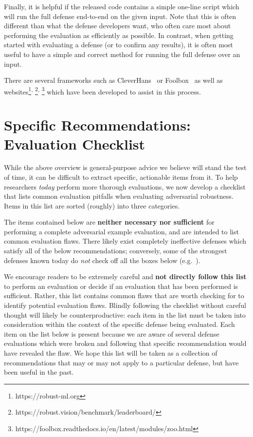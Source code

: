 \documentclass{article} %
\begin{document}
Finally, it is helpful if the released code contains a simple one-line
script which will run the full defense end-to-end on the given input.
%
Note that this is often different than what the defense developers want,
who often care most about performing the evaluation as efficiently as
possible.
%
In contrast, when getting started with evaluating a defense (or to
confirm any results), it is
often most useful to have a simple and correct method for running the
full defense over an input.

There are several frameworks such as CleverHans~\citep{papernot2018cleverhans} or Foolbox~\citep{rauber2017foolbox}
as well as websites\footnote{https://robust-ml.org}\textsuperscript{,}%
\footnote{https://robust.vision/benchmark/leaderboard/}\textsuperscript{,}%
\footnote{https://foolbox.readthedocs.io/en/latest/modules/zoo.html}
which have been developed to assist in this process.


\section{Specific Recommendations: Evaluation Checklist}
\label{sec:dont_do_bad_science}
\label{sec:pleaseactuallythink}
While the above overview is general-purpose advice we believe will stand the
test of time, it can be difficult to extract specific, actionable items
from it.
%
To help researchers \emph{today} perform more thorough evaluations,
we now develop a checklist that lists common evaluation
pitfalls when evaluating adversarial robustness. Items in this list are
sorted (roughly) into three categories.

The items contained below are \textbf{neither necessary nor sufficient}
for performing a complete adversarial example evaluation, and are
intended to list common evaluation flaws.
%
There likely exist completely ineffective defenses which satisfy all of
the below recommendations; conversely, some of the strongest defenses
known today do \emph{not} check off all the boxes below (e.g.\ \citet{madry2017towards}).

We encourage readers to be extremely careful and \textbf{not directly follow
  this list} to perform an evaluation or decide if an evaluation that has been
performed is sufficient.
%
Rather, this list contains common flaws that are worth checking for to
identify potential evaluation flaws.
%
Blindly following the checklist without careful thought will likely be counterproductive:
each item in the list must be taken into consideration within the context
of the specific defense being evaluated. 
%
Each item on the list below is present because we are aware of several defense
evaluations which were broken and following that specific recommendation would have
revealed the flaw.
%
We hope this list will be taken as a collection of recommendations that may
or may not apply to a particular defense, but have been useful in the past.
\end{document}

